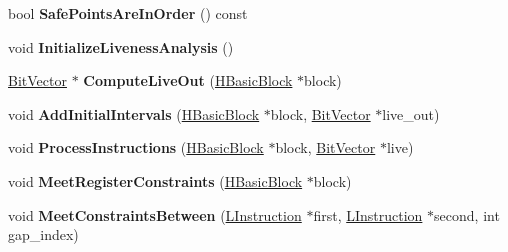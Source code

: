 \begin{DoxyCompactItemize}
\item 
bool {\bfseries Safe\+Points\+Are\+In\+Order} () const \hypertarget{classv8_1_1internal_1_1_b_a_s_e___e_m_b_e_d_d_e_d_a3da7e2ee152eba22516b36d6e23dd8b1}{}\label{classv8_1_1internal_1_1_b_a_s_e___e_m_b_e_d_d_e_d_a3da7e2ee152eba22516b36d6e23dd8b1}

\item 
void {\bfseries Initialize\+Liveness\+Analysis} ()\hypertarget{classv8_1_1internal_1_1_b_a_s_e___e_m_b_e_d_d_e_d_a4360d4a1a7beebe4235e41c41ab035e6}{}\label{classv8_1_1internal_1_1_b_a_s_e___e_m_b_e_d_d_e_d_a4360d4a1a7beebe4235e41c41ab035e6}

\item 
\hyperlink{classv8_1_1internal_1_1_bit_vector}{Bit\+Vector} $\ast$ {\bfseries Compute\+Live\+Out} (\hyperlink{classv8_1_1internal_1_1_h_basic_block}{H\+Basic\+Block} $\ast$block)\hypertarget{classv8_1_1internal_1_1_b_a_s_e___e_m_b_e_d_d_e_d_a886a14d04ad95286e48385b8a5abe094}{}\label{classv8_1_1internal_1_1_b_a_s_e___e_m_b_e_d_d_e_d_a886a14d04ad95286e48385b8a5abe094}

\item 
void {\bfseries Add\+Initial\+Intervals} (\hyperlink{classv8_1_1internal_1_1_h_basic_block}{H\+Basic\+Block} $\ast$block, \hyperlink{classv8_1_1internal_1_1_bit_vector}{Bit\+Vector} $\ast$live\+\_\+out)\hypertarget{classv8_1_1internal_1_1_b_a_s_e___e_m_b_e_d_d_e_d_af141f7910fb2e4364a2c3b60e3d9f1a0}{}\label{classv8_1_1internal_1_1_b_a_s_e___e_m_b_e_d_d_e_d_af141f7910fb2e4364a2c3b60e3d9f1a0}

\item 
void {\bfseries Process\+Instructions} (\hyperlink{classv8_1_1internal_1_1_h_basic_block}{H\+Basic\+Block} $\ast$block, \hyperlink{classv8_1_1internal_1_1_bit_vector}{Bit\+Vector} $\ast$live)\hypertarget{classv8_1_1internal_1_1_b_a_s_e___e_m_b_e_d_d_e_d_a810477fd1790240af33307c4371467f6}{}\label{classv8_1_1internal_1_1_b_a_s_e___e_m_b_e_d_d_e_d_a810477fd1790240af33307c4371467f6}

\item 
void {\bfseries Meet\+Register\+Constraints} (\hyperlink{classv8_1_1internal_1_1_h_basic_block}{H\+Basic\+Block} $\ast$block)\hypertarget{classv8_1_1internal_1_1_b_a_s_e___e_m_b_e_d_d_e_d_a747c572bc5e27b68e1deec69e5c0e0d7}{}\label{classv8_1_1internal_1_1_b_a_s_e___e_m_b_e_d_d_e_d_a747c572bc5e27b68e1deec69e5c0e0d7}

\item 
void {\bfseries Meet\+Constraints\+Between} (\hyperlink{classv8_1_1internal_1_1_l_instruction}{L\+Instruction} $\ast$first, \hyperlink{classv8_1_1internal_1_1_l_instruction}{L\+Instruction} $\ast$second, int gap\+\_\+index)\hypertarget{classv8_1_1internal_1_1_b_a_s_e___e_m_b_e_d_d_e_d_a86b88a15f2cc315ded5aace049f04784}{}\label{classv8_1_1internal_1_1_b_a_s_e___e_m_b_e_d_d_e_d_a86b88a15f2cc315ded5aace049f04784}


\end{DoxyCompactItemize}
